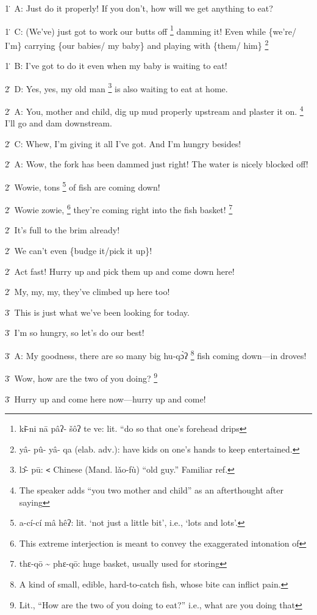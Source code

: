 1\. A: Just do it properly! If you don't, how will we get anything to eat?

1\. C: (We've) just got to work our butts off \footnote{kɨ̄-ni  nā  pâʔ- šôʔ  te  ve: lit. ``do so that one's forehead drips} damming it! Even while \{we're/
I'm\} carrying \{our babies/ my baby\} and playing with \{them/ him\} \footnote{yâ- pû- yâ- qa (elab. adv.): have kids on one's hands to keep entertained.}

1\. B: I've got to do it even when my baby is waiting to eat!

2\. D: Yes, yes, my old man \footnote{lɔ̂- pū: \texttt{<} Chinese (Mand. lǎo-fù) ``old guy.'' Familiar ref.} is also waiting to eat at home.

2\. A: You, mother and child, dig up mud properly upstream and plaster it on. \footnote{The speaker adds ``you two mother and child'' as an afterthought after saying}
I'll go and dam downstream.

2\. C: Whew, I'm giving it all I've got.  And I'm hungry besides!

2\. A: Wow, the fork has been dammed just right! The water is nicely blocked off!

2\. Wowie, tons \footnote{a-cí-cí mâ hêʔ: lit. `not just a little bit', i.e., `lots and lots'.} of fish are coming down!

2\. Wowie zowie, \footnote{This extreme interjection is meant to convey the exaggerated intonation of} they're coming right into the fish basket! \footnote{thɛ-qō \textasciitilde{} phɛ-qō: huge basket, usually used for storing}

2\. It's full to the brim already!

2\. We can't even \{budge it/pick it up\}!

2\. Act fast! Hurry up and pick them up and come down here!

2\. My, my, my, they've climbed up here too!

3\. This is just what we've been looking for today.

3\. I'm so hungry, so let's do our best!

3\. A: My goodness, there are so many big hu-qɔ̀ʔ \footnote{A kind of small, edible, hard-to-catch fish, whose bite can inflict pain.} fish coming down---in
droves!

3\. Wow, how are the two of you doing? \footnote{Lit., ``How are the two of you doing to eat?'' i.e., what are you doing that}

3\. Hurry up and come here now---hurry up and come!

